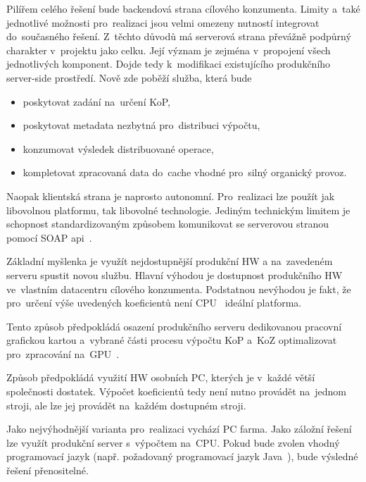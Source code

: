 Pilířem celého řešení bude backendová strana cílového konzumenta. Limity a~také jednotlivé možnosti pro~realizaci jsou velmi omezeny nutností integrovat do~současného řešení. Z~těchto důvodů má serverová strana převážně podpůrný charakter v~projektu jako celku. Její význam je zejména v~propojení všech jednotlivých komponent. Dojde tedy k~modifikaci existujícího produkčního server-side prostředí. Nově zde poběží služba, která bude
\begin{itemize}
	\setlength{\parskip}{0pt}
	\setlength{\itemsep}{0pt}
	\item {poskytovat zadání na~určení KoP,}
	\item {poskytovat metadata nezbytná pro~distribuci výpočtu,}
	\item {konzumovat výsledek distribuované operace,}
	\item {kompletovat zpracovaná data do~cache vhodné pro~silný organický provoz.}
\end{itemize}
Naopak klientská strana je naprosto autonomní. Pro~realizaci lze použít jak libovolnou platformu, tak libovolné technologie. Jediným technickým limitem je schopnost standardizovaným způsobem komunikovat se serverovou stranou pomocí SOAP api~\cite{soap}.

Základní myšlenka je využít nejdostupnější produkční HW a na~zavedeném serveru spustit novou službu. Hlavní výhodou je dostupnost produkčního HW ve~vlastním datacentru cílového konzumenta. Podstatnou nevýhodou je fakt, že pro~určení výše uvedených koeficientů není CPU~\cite{cpu} ideální platforma.

Tento způsob předpokládá osazení produkčního serveru dedikovanou pracovní grafickou kartou a~vybrané části procesu výpočtu KoP a~KoZ optimalizovat pro~zpracování na~GPU~\cite{gpu}.

Způsob předpokládá využití HW osobních PC, kterých je v~každé větší společnosti dostatek. Výpočet koeficientů tedy není nutno provádět na~jednom stroji, ale lze jej provádět na~každém dostupném stroji.

Jako nejvýhodnější varianta pro~realizaci vychází PC farma. Jako záložní řešení lze využít produkční server s~výpočtem na~CPU. Pokud bude zvolen vhodný programovací jazyk (např. požadovaný programovací jazyk Java~\cite{java}), bude výsledné řešení přenositelné.

